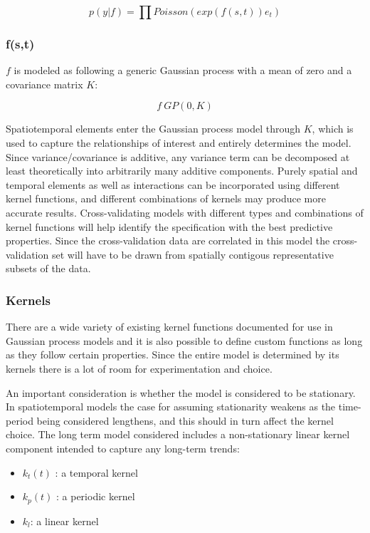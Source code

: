 $$p(y|f) = \prod{ Poisson(exp(f(s,t))e_t)}$$

\subsubsection{f(s,t)}

$f$ is modeled as following a generic Gaussian process with a mean of zero and a covariance matrix $K$:

$$ f ~ GP(0,K) $$

Spatiotemporal elements enter the Gaussian process model through $K$, which is used to capture the relationships of interest and entirely determines the model. Since variance/covariance is additive, any variance term can be decomposed at least theoretically into arbitrarily many additive components. Purely spatial and temporal elements as well as interactions can be incorporated using different kernel functions, and different combinations of kernels may produce more accurate results. Cross-validating models with different types and combinations of kernel functions will help identify the specification with the best predictive properties. Since the cross-validation data are correlated in this model the cross-validation set will have to be drawn from spatially contigous representative subsets of the data.

\subsubsection{Kernels}

There are a wide variety of existing kernel functions documented for use in Gaussian process models \cite{rasmussen_2005} and it is also possible to define custom functions as long as they follow certain properties. Since the entire model is determined by its kernels there is a lot of room for experimentation and choice. \par

An important consideration is whether the model is considered to be stationary. In spatiotemporal models the case for assuming stationarity weakens as the time-period being considered lengthens, and this should in turn affect the kernel choice. The long term model considered includes a non-stationary linear kernel component intended to capture any long-term trends:    \par

\begin{itemize}
  \item $k_t(t)$ : a temporal kernel
  \item $k_p(t)$ : a periodic kernel
  \item $k_l$: a linear kernel
\end{itemize}

